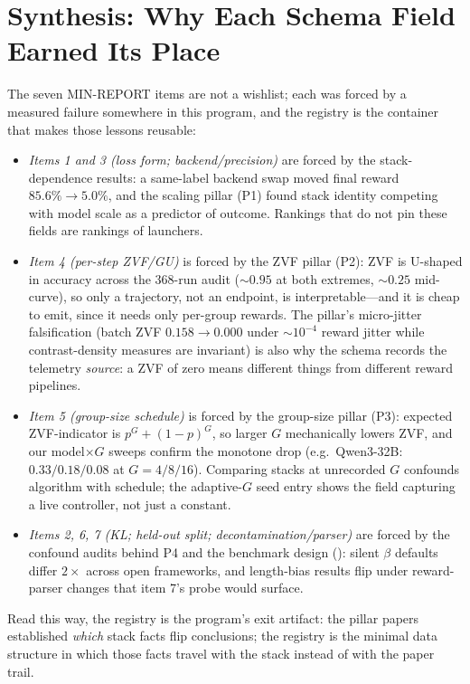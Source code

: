 \section{Synthesis: Why Each Schema Field Earned Its Place}
\label{sec:p6-synthesis}

The seven MIN-REPORT items are not a wishlist; each was forced by a measured
failure somewhere in this program, and the registry is the container that
makes those lessons reusable:

\begin{itemize}[leftmargin=1.5em, itemsep=0.15em]
  \item \emph{Items 1 and 3 (loss form; backend/precision)} are forced by the
        stack-dependence results: a same-label backend swap moved final reward
        $85.6\% \to 5.0\%$, and the scaling pillar (P1) found stack identity
        competing with model scale as a predictor of outcome. Rankings that do
        not pin these fields are rankings of launchers.
  \item \emph{Item 4 (per-step ZVF/GU)} is forced by the ZVF pillar (P2): ZVF
        is U-shaped in accuracy across the 368-run audit (${\sim}0.95$ at both
        extremes, ${\sim}0.25$ mid-curve), so only a trajectory, not an
        endpoint, is interpretable---and it is cheap to emit, since it needs
        only per-group rewards. The pillar's micro-jitter falsification
        (batch ZVF $0.158 \to 0.000$ under $\sim$$10^{-4}$ reward jitter while
        contrast-density measures are invariant) is also why the schema
        records the telemetry \emph{source}: a ZVF of zero means different
        things from different reward pipelines.
  \item \emph{Item 5 (group-size schedule)} is forced by the group-size pillar
        (P3): expected ZVF-indicator is $p^G + (1-p)^G$, so larger $G$
        mechanically lowers ZVF, and our model$\times G$ sweeps confirm the
        monotone drop (e.g.\ Qwen3-32B: $0.33/0.18/0.08$ at $G{=}4/8/16$).
        Comparing stacks at unrecorded $G$ confounds algorithm with schedule;
        the adaptive-$G$ seed entry shows the field capturing a live
        controller, not just a constant.
  \item \emph{Items 2, 6, 7 (KL; held-out split; decontamination/parser)} are
        forced by the confound audits behind P4 and the benchmark design
        (): silent $\beta$ defaults differ $2\times$
        across open frameworks, and length-bias results flip under
        reward-parser changes that item 7's probe would surface.
\end{itemize}

Read this way, the registry is the program's exit artifact: the pillar papers
established \emph{which} stack facts flip conclusions; the registry is the
minimal data structure in which those facts travel with the stack instead of
with the paper trail.
